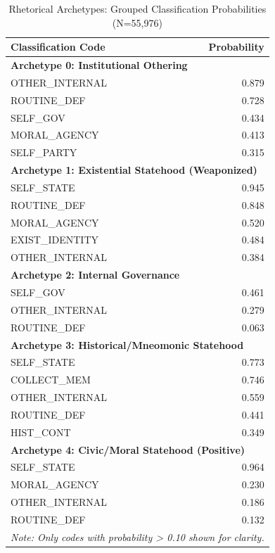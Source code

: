 \begin{table}[htbp]
\centering
\caption{Rhetorical Archetypes: Grouped Classification Probabilities (N=55,976)}
\label{tab:grouped_clusters}
\small
\begin{tabular}{lr}
\toprule
\textbf{Classification Code} & \textbf{Probability} \\ 
\midrule
\multicolumn{2}{l}{\textbf{Archetype 0: Institutional Othering}} \\
\midrule
OTHER\_INTERNAL & 0.879 \\
ROUTINE\_DEF    & 0.728 \\
SELF\_GOV       & 0.434 \\
MORAL\_AGENCY   & 0.413 \\
SELF\_PARTY     & 0.315 \\
\midrule
\multicolumn{2}{l}{\textbf{Archetype 1: Existential Statehood (Weaponized)}} \\
\midrule
SELF\_STATE     & 0.945 \\
ROUTINE\_DEF    & 0.848 \\
MORAL\_AGENCY   & 0.520 \\
EXIST\_IDENTITY & 0.484 \\
OTHER\_INTERNAL & 0.384 \\
\midrule
\multicolumn{2}{l}{\textbf{Archetype 2: Internal Governance}} \\
\midrule
SELF\_GOV       & 0.461 \\
OTHER\_INTERNAL & 0.279 \\
ROUTINE\_DEF    & 0.063 \\
\midrule
\multicolumn{2}{l}{\textbf{Archetype 3: Historical/Mneomonic Statehood}} \\
\midrule
SELF\_STATE     & 0.773 \\
COLLECT\_MEM    & 0.746 \\
OTHER\_INTERNAL & 0.559 \\
ROUTINE\_DEF    & 0.441 \\
HIST\_CONT      & 0.349 \\
\midrule
\multicolumn{2}{l}{\textbf{Archetype 4: Civic/Moral Statehood (Positive)}} \\
\midrule
SELF\_STATE     & 0.964 \\
MORAL\_AGENCY   & 0.230 \\
OTHER\_INTERNAL & 0.186 \\
ROUTINE\_DEF    & 0.132 \\
\bottomrule

\multicolumn{2}{l}{\textit{Note: Only codes with probability > 0.10 shown for clarity.}} \\
\end{tabular}
\end{table}





